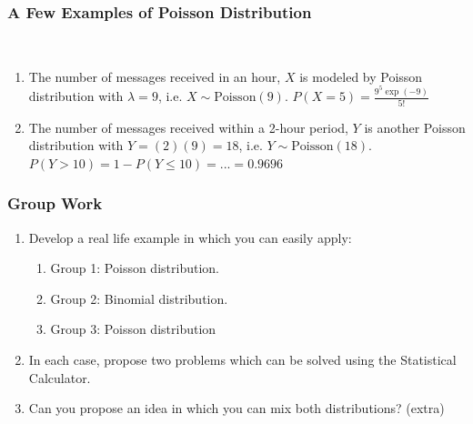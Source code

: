 \documentclass[compress]{beamer}
\begin{document}
\begin{frame}\frametitle{A Few Examples of Poisson Distribution }
\vspace{-.1in}
\\


\vspace{.5in}
{\tiny 
\begin{enumerate}
\item The number of messages received in an hour, $X$ is modeled by
Poisson distribution with $\lambda =  9$, i.e.  $X\sim \text{Poisson}(9)$.
$P(X=5)= \frac{9^5 \exp(-9)}{5!}$
\item The number of messages received within a 2-hour period, $Y$ is
another Poisson distribution with  $Y= (2)(9) =18$, i.e. $Y\sim  \text{Poisson}(18)$.
$P(Y > 10) =1- P(Y\leq 10 )= ...= 0.9696$
\end{enumerate}

}

\end{frame}




\begin{frame}\frametitle{Group Work }
\begin{enumerate}
\item Develop a real life example in which you can easily apply:
\begin{enumerate}
\item  Group 1: Poisson distribution.
\item  Group 2: Binomial distribution.
\item Group 3: Poisson distribution
\end{enumerate}
\item  In each case, propose two problems which can be solved using the Statistical Calculator.
\item Can you propose an idea in which you can mix both distributions?
(extra)
\end{enumerate}

\end{frame}
\end{document}
